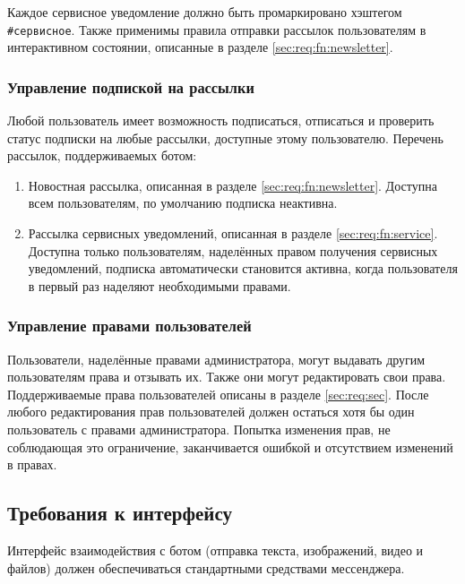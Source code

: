         Каждое сервисное уведомление должно быть промаркировано хэштегом \hbox{\texttt{\#сервисное}}.
        Также применимы правила отправки рассылок пользователям в интерактивном состоянии,
        описанные в разделе \ref{sec:req:fn:newsletter}.

    \subsubsection{Управление подпиской на рассылки}
        \label{sec:req:fn:subscriptions}
        Любой пользователь имеет возможность подписаться, отписаться и проверить статус подписки на
        любые рассылки, доступные этому пользователю. Перечень рассылок, поддерживаемых ботом:
        \begin{enumerate}
            \item
                Новостная рассылка, описанная в разделе \ref{sec:req:fn:newsletter}.
                Доступна всем пользователям, по умолчанию подписка неактивна.
            \item
                Рассылка сервисных уведомлений, описанная в разделе \ref{sec:req:fn:service}.
                Доступна только пользователям, наделённых правом получения сервисных уведомлений,
                подписка автоматически становится активна, когда пользователя в первый
                раз наделяют необходимыми правами.
        \end{enumerate}

    \subsubsection{Управление правами пользователей}
        \label{seq:req:fn:roles}
        Пользователи, наделённые правами администратора, могут выдавать другим
        пользователям права и отзывать их. Также они могут редактировать свои права.
        Поддерживаемые права пользователей описаны в разделе \ref{sec:req:sec}.
        После любого редактирования прав пользователей должен остаться хотя бы один
        пользователь с правами администратора. Попытка изменения прав, не соблюдающая
        это ограничение, заканчивается ошибкой и отсутствием изменений в правах.

\subsection{Требования к интерфейсу}
    \label{sec:req:ui}
    Интерфейс взаимодействия с ботом (отправка текста, изображений, видео и файлов)
    должен обеспечиваться стандартными средствами мессенджера.

